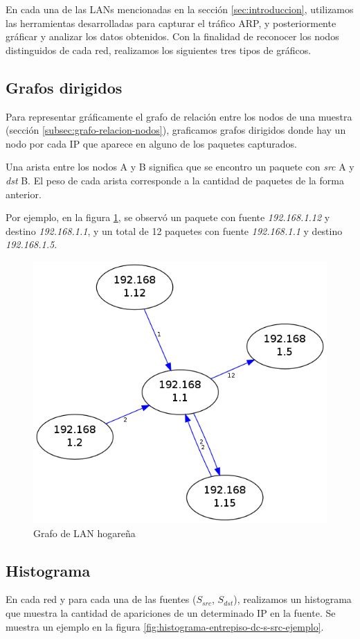 En cada una de las LANs mencionadas en la sección \ref{sec:introduccion}, utilizamos las herramientas desarrolladas para capturar el tráfico ARP, y posteriormente gráficar y analizar los datos obtenidos. Con la finalidad de reconocer los nodos distinguidos de cada red, realizamos los siguientes tres tipos de gráficos.

\subsection{Grafos dirigidos}

  Para representar gráficamente el grafo de relación entre los nodos de una muestra (sección \ref{subsec:grafo-relacion-nodos}), graficamos grafos dirigidos donde hay un nodo por cada IP que aparece en alguno de los paquetes capturados.
 
  Una arista entre los nodos A y B significa que se encontro un paquete con \emph{src} A y \emph{dst} B. El peso de cada arista corresponde a la cantidad de paquetes de la forma anterior.
  
  Por ejemplo, en la figura \ref{fig:FedeGrafo-ejemplo}, se observó un paquete con fuente \emph{192.168.1.12} y destino \emph{192.168.1.1}, y un total de 12 paquetes con fuente \emph{192.168.1.1} y destino \emph{192.168.1.5}.
  
  \begin{figure}[H]
  \begin{center}
    \includegraphics[width=0.3\linewidth]{../imgs/red-hogarena_red.png}
    \caption{Grafo de LAN hogareña}
    \label{fig:FedeGrafo-ejemplo}
  \end{center}
\end{figure}

\subsection{Histograma}

  En cada red y para cada una de las fuentes ($S_{src}$, $S_{dst}$), realizamos un histograma que muestra la cantidad de apariciones de un determinado IP en la fuente. Se muestra un ejemplo en la figura \ref{fig:histograma-entrepiso-dc-s-src-ejemplo}.
  
